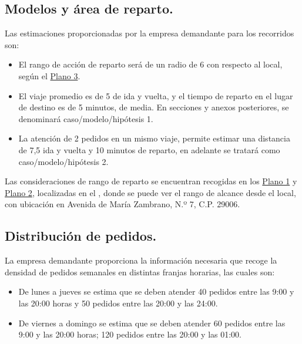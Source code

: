 \subsection{Modelos y  área de reparto.}
\label{consideraciones_preliminares_area_de_reparto}

Las estimaciones proporcionadas por la empresa demandante para los recorridos son:

\begin{itemize}
    \item El rango de acción de reparto será de un radio de 6  con respecto al local, según el \hyperref[plano:radio]{\hyperlink{plano:radio}{Plano 3}}. 
    \item El viaje promedio es de 5  de ida y vuelta, y el tiempo de reparto en el lugar de destino es de 5 minutos, de media. En secciones y anexos posteriores, se denominará caso/modelo/hipótesis 1.
    \item La atención de 2 pedidos en un mismo viaje, permite estimar una distancia de 7,5  ida y vuelta y 10 minutos de reparto, en adelante se tratará como caso/modelo/hipótesis 2.
\end{itemize}

Las consideraciones de rango de reparto se encuentran recogidas en los \hyperref[plano:situacion]{\hyperlink{plano:situacion}{Plano 1}}  y \hyperref[plano:emplazamiento]{\hyperlink{plano:emplazamiento}{Plano 2}}, localizadas en el , donde se puede ver el rango de alcance desde el local, con ubicación en Avenida de María Zambrano, N.º 7, C.P. 29006.

\subsection{Distribución de pedidos.}
\label{consideraciones_preliminares_tiempos}
La empresa demandante proporciona la información necesaria que recoge la densidad de pedidos semanales en distintas franjas horarias, las cuales son:

\begin{itemize}
    \item De lunes a jueves se estima que se deben atender 40 pedidos entre las 9:00 y las 20:00 horas y 50 pedidos entre las 20:00 y las 24:00.
    \item De viernes a domingo se estima que se deben atender 60 pedidos entre las 9:00 y las 20:00 horas; 120 pedidos entre las 20:00 y las 01:00.
\end{itemize}

